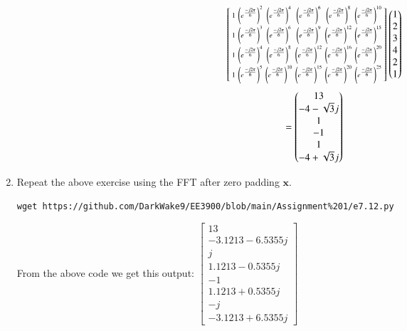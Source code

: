 \documentclass[journal,12pt,twocolumn]{IEEEtran}
\let\vec\mathbf
\renewcommand\thesection{\arabic{section}}
\begin{document}
\begin{enumerate}[label=\arabic*.,ref=\thesection.\theenumi]
\begin{align}
\begin{bsmallmatrix}
		1	&	\left(e^{\frac{-j2\pi}{6}}\right)^2	&	\left(e^{\frac{-j2\pi}{6}}\right)^4	&	\left(e^{\frac{-j2\pi}{6}}\right)^6	&	\left(e^{\frac{-j2\pi}{6}}\right)^8	&	\left(e^{\frac{-j2\pi}{6}}\right)^{10}\\
		1	&	\left(e^{\frac{-j2\pi}{6}}\right)^3	&	\left(e^{\frac{-j2\pi}{6}}\right)^6	&	\left(e^{\frac{-j2\pi}{6}}\right)^9	&	\left(e^{\frac{-j2\pi}{6}}\right)^{12}	&	\left(e^{\frac{-j2\pi}{6}}\right)^{15}\\
		1	&	\left(e^{\frac{-j2\pi}{6}}\right)^4	&	\left(e^{\frac{-j2\pi}{6}}\right)^8	&	\left(e^{\frac{-j2\pi}{6}}\right)^{12}	&	\left(e^{\frac{-j2\pi}{6}}\right)^{16}	&	\left(e^{\frac{-j2\pi}{6}}\right)^{20}\\
		1	&	\left(e^{\frac{-j2\pi}{6}}\right)^5	&	\left(e^{\frac{-j2\pi}{6}}\right)^{10}	&	\left(e^{\frac{-j2\pi}{6}}\right)^{15}	&	\left(e^{\frac{-j2\pi}{6}}\right)^{20}	&	\left(e^{\frac{-j2\pi}{6}}\right)^{25}
	\end{bsmallmatrix}
	\begin{pmatrix}1\\2\\3\\4\\2\\1\end{pmatrix}
\end{align}
\begin{align}
	=\begin{pmatrix}13\\-4 - \sqrt{3}j\\ 1\\-1\\1\\-4 + \sqrt{3}j\end{pmatrix}
\end{align}





\item Repeat the above exercise using the FFT
after zero padding $\vec{x}$.\\

\solution
\begin{lstlisting}
wget https://github.com/DarkWake9/EE3900/blob/main/Assignment%201/e7.12.py
\end{lstlisting}


From the above code we get this output:
$\begin{bmatrix}
	13\\
	-3.1213-6.5355j\\
	j\\
	1.1213-0.5355j\\
	-1\\
	1.1213+0.5355j\\
	-j\\
	-3.1213+6.5355j
\end{bmatrix}$


\end{enumerate}
\end{document}
